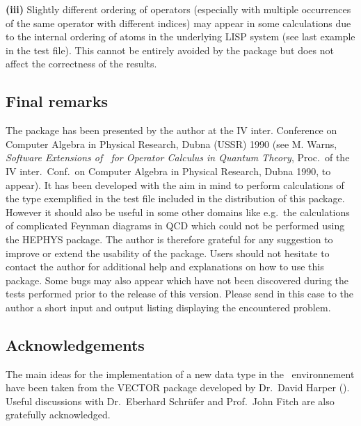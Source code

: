 \textbf{(iii)} Slightly different ordering of operators (especially with
multiple occurrences of the same operator with different indices)
may appear in some calculations
due to the internal ordering of atoms in the underlying LISP system
(see last example in the test file). This cannot be entirely avoided
by the package but does not affect the correctness  of the results.


\subsection{Final remarks}
The package  has been presented by
the author at the IV inter. Conference on Computer Algebra in Physical
Research, Dubna (USSR) 1990 (see M. Warns,
\textit{Software Extensions of \REDUCE\ for Operator Calculus in Quantum Theory},
Proc.\ of the IV inter.\ Conf.\ on Computer Algebra in Physical
Research, Dubna 1990, to appear). It has been developed with the aim in
mind to perform calculations of the type exemplified in the test file
included in the distribution of this package.
However it should
also be useful in some other domains like e.g.\ the calculations of
complicated Feynman diagrams in QCD  which could not be  performed using
the HEPHYS package. The author is  therefore grateful for any
suggestion
to improve or extend the usability of the package. Users should not
hesitate to contact the author for additional help and explanations on
how to use
this package. Some bugs may also
appear which have not been discovered during the tests performed
prior to the release of this version. Please send in this case to the
author  a short
input and output listing  displaying the encountered problem.

\subsection*{Acknowledgements}
The main ideas for the implementation of a new data type in the \REDUCE\
environnement have been taken from the VECTOR package developed by
Dr.\ David Harper (\cite{Harper:89a}).
Useful discussions with  Dr.\ Eberhard Schr\"ufer  and
Prof.\ John Fitch are also gratefully acknowledged.


